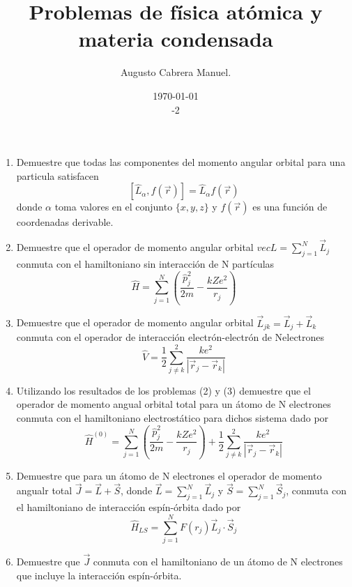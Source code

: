 \documentclass[]{article}
\title{Problemas de física atómica y materia condensada}
\author{Augusto Cabrera Manuel.}
\date{\today\\ \ser 3 \sem 2018-2 }
\begin{document}
\maketitle
\begin{enumerate}
\item Demuestre que todas las componentes  del momento angular orbital para una particula satisfacen
  \begin{equation*}
    \left[\hat{L}_{\alpha},f\left(\vec{r}\right)\right]=\hat{L}_{\alpha}f\left(\vec{r}\right)
  \end{equation*}
donde $\alpha$ toma valores en el conjunto $\{x,y,z\}$ y $f\left(\vec{r}\right)$ es una función de coordenadas derivable.
\item Demuestre que el operador  de momento angular orbital $vec{L}=\sum_{j=1}^{N} \vec{L}_j $ conmuta con el hamiltoniano sin interacción de N partículas
  \begin{equation*}
    \hat{H}=\sum^{N}_{j=1}\left(\frac{\hat{p}^2_j}{2m}-\frac{kZe^2}{r_j}\right)
  \end{equation*}
\item Demuestre que el operador de momento angular orbital $\vec{L}_{jk}=\vec{L}_j+\vec{L}_k$ conmuta con el operador de interacción electrón-electrón de Nelectrones
  \begin{equation*}
    \hat{V}=\frac{1}{2}\sum^2_{j\neq k}\frac{ke^2}{\left|\vec{r}_j-\vec{r}_k\right|}
  \end{equation*}
\item Utilizando los resultados de los problemas (2) y (3) demuestre que el operador  de momento angual orbital total para un átomo de N electrones conmuta con el hamiltoniano electrostático para dichos sistema dado por
  \begin{equation*}
    \hat{H}^{\left(0\right)}=\sum^{N}_{j=1}\left(\frac{\hat{p}^2_j}{2m}-\frac{kZe^2}{r_j}\right)+\frac{1}{2}\sum^2_{j\neq k}\frac{ke^2}{\left|\vec{r}_j-\vec{r}_k\right|}
  \end{equation*}
\item Demuestre  que para un átomo de N electrones el  operador de momento angualr total $\vec{J}=\vec{L}+\vec{S}$, donde $\vec{L}=\sum_{j=1}^N\vec{L}_j$ y $\vec{S}=\sum_{j=1}^N\vec{S}_j$, conmuta con el hamiltoniano de interacción espín-órbita dado por
  \begin{equation*}
    \hat{H}_{LS}=\sum_{j=1}^{N}F(r_j)\vec{L}_j\cdot\vec{S}_j
  \end{equation*}
\item  Demuestre que $\vec{J}$ conmuta con el hamiltoniano de un átomo de N electrones que incluye la interacción espín-órbita.

\end{enumerate}
\end{document}
